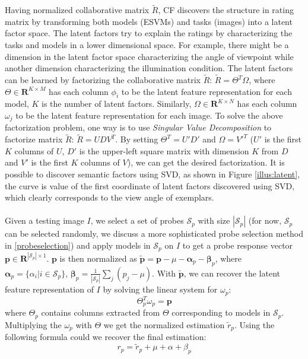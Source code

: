 \documentclass{article} %
\begin{document}
Having normalized collaborative matrix $\tilde{R}$, CF discovers the structure in rating matrix by transforming both models (ESVMs) and tasks (images) into a latent factor space. The latent factors try to explain the ratings by characterizing the tasks and models in a lower dimensional space. For example, there might be a dimension in the latent factor space characterizing the angle of viewpoint while another dimension characterizing the illumination condition. The latent factors can be learned by factorizing the collaborative matrix $\tilde{R}$: $\tilde{R}=\Theta^T\Omega$, where $\Theta{\in}\mathbf{R}^{K{\times}M}$ has each column $\phi_i$ to be the latent feature representation for each model, $K$ is the number of latent factors. Similarly, $\Omega{\in}\mathbf{R}^{K{\times}N}$ has each column $\omega_j$ to be the latent feature representation for each image. To solve the above factorization problem, one way is to use \emph{Singular Value Decomposition} to factorize matrix $\tilde{R}$: $\tilde{R}=UDV^T$. By setting $\Theta^T=U'D'$ and $\Omega=V'^T$ ($U'$ is the first $K$ columns of $U$, $D'$ is the upper-left square matrix with dimension $K$ from $D$ and $V'$ is the first $K$ columns of $V$), we can get the desired factorization. It is possible to discover semantic factors using SVD, as shown in Figure \ref{illus:latent}, the curve is value of the first coordinate of latent factors discovered using SVD, which clearly corresponds to the view angle of exemplars. \\\\
Given a testing image $I$, we select a set of probes $\mathcal{S}_p$ with size $|\mathcal{S}_p|$ (for now, $\mathcal{S}_p$ can be selected randomly, we discuss a more sophisticated probe selection method in \ref{probeselection}) and apply models in $\mathcal{S}_p$ on $I$ to get a probe response vector $\mathbf{p}{\in}\mathbf{R}^{|\mathcal{S}_p|\times1}$. $\mathbf{p}$ is then normalized as $\mathbf{\tilde{p}}=\mathbf{p}-\mu-\mathbf{\alpha}_p-\mathbf{\beta}_p$, where $\mathbf{\alpha}_p=\{\alpha_i|i{\in}\mathcal{S}_p\}$, $\mathbf{\beta}_p=\frac{1}{|\mathcal{S}_p|}\sum_j(p_j-\mu)$.  With $\mathbf{\tilde{p}}$, we can recover the latent feature representation of $I$ by solving the linear system for $\omega_p$:
$$\Theta_p^T\omega_p=\mathbf{p}$$
where $\Theta_p$ contains columns extracted from $\Theta$ corresponding to models in $\mathcal{S}_p$. Multiplying the $\omega_p$ with $\Theta$ we get the normalized estimation $\tilde{r}_p$. Using the following formula could we recover the final estimation:
$$r_p=\tilde{r}_p+\mu+\alpha+\beta_p$$
\end{document}

